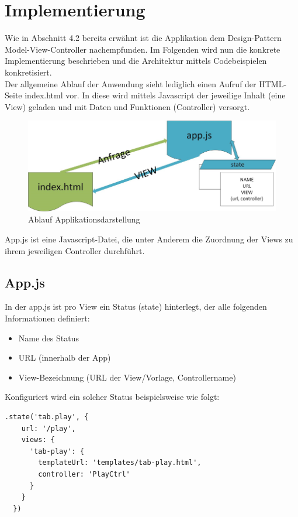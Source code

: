 \newpage
\section{Implementierung}
Wie in Abschnitt 4.2 bereits erwähnt ist die Applikation dem Design-Pattern Model-View-Controller nachempfunden. Im Folgenden wird nun die konkrete Implementierung beschrieben und die Architektur mittels Codebeispielen konkretisiert.
\\
Der allgemeine Ablauf der Anwendung sieht lediglich einen Aufruf der HTML-Seite index.html vor. In diese wird mittels Javascript der jeweilige Inhalt (eine View) geladen und mit Daten und Funktionen (Controller) versorgt.
\begin{figure}[h]
\centering
\includegraphics[width=1\textwidth]{ref/images/index.png}
\caption[Ablauf Applikationsdarstellung]{Ablauf Applikationsdarstellung}
\label{fig:HTML-Darstellung}
\end{figure}

App.js ist eine Javascript-Datei, die unter Anderem die Zuordnung der Views zu ihrem jeweiligen Controller durchführt. 
\subsection{App.js}
In der app.js ist pro View ein Status (state) hinterlegt, der alle folgenden Informationen definiert:
\begin{itemize}
\item Name des Status
\item URL (innerhalb der App)
\item View-Bezeichnung (URL der View/Vorlage, Controllername)
\end{itemize}
Konfiguriert wird ein solcher Status beispielsweise wie folgt:
\begin{lstlisting}
.state('tab.play', {
    url: '/play',
    views: {
      'tab-play': {
        templateUrl: 'templates/tab-play.html',
        controller: 'PlayCtrl'
      }
    }
  })
\end{lstlisting}

